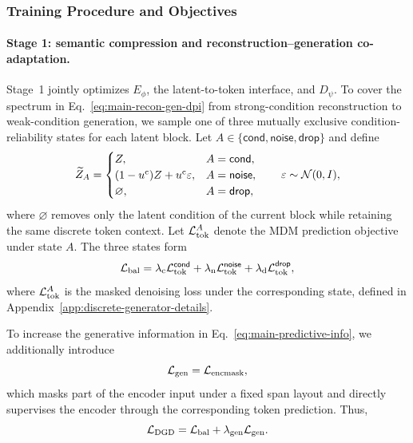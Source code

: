 \subsubsection{Training Procedure and Objectives}
\label{subsec:workflow-train}

\paragraph{Stage 1: semantic compression and reconstruction--generation co-adaptation.}
Stage~1 jointly optimizes $E_\phi$, the latent-to-token interface, and $D_\psi$. To cover the spectrum in Eq.~\eqref{eq:main-recon-gen-dpi} from strong-condition reconstruction to weak-condition generation, we sample one of three mutually exclusive condition-reliability states for each latent block. Let $A\in\{\textsf{cond},\textsf{noise},\textsf{drop}\}$ and define
\begin{equation}
    \widetilde Z_A=
    \begin{cases}
        Z, & A=\textsf{cond},\\
        (1-u^{\mathrm c})Z+u^{\mathrm c}\varepsilon,
        & A=\textsf{noise},\\
        \varnothing, & A=\textsf{drop},
    \end{cases}
    \qquad
    \varepsilon\sim\mathcal{N}(0,I),
    \label{eq:workflow-reliability}
\end{equation}
where $\varnothing$ removes only the latent condition of the current block while retaining the same discrete token context. Let $\mathcal{L}_{\mathrm{tok}}^{A}$ denote the MDM prediction objective under state $A$. The three states form
\begin{equation}
    \mathcal{L}_{\mathrm{bal}}
    =\lambda_{\mathrm c}\mathcal{L}_{\mathrm{tok}}^{\textsf{cond}}
    +\lambda_{\mathrm n}\mathcal{L}_{\mathrm{tok}}^{\textsf{noise}}
    +\lambda_{\mathrm d}\mathcal{L}_{\mathrm{tok}}^{\textsf{drop}},
    \label{eq:workflow-balance-loss}
\end{equation}
where $\mathcal{L}_{\mathrm{tok}}^{A}$ is the masked denoising loss under the corresponding state, defined in Appendix~\ref{app:discrete-generator-details}.

To increase the generative information in Eq.~\eqref{eq:main-predictive-info}, we additionally introduce
\begin{equation}
    \mathcal{L}_{\mathrm{gen}}=\mathcal{L}_{\mathrm{encmask}},
    \label{eq:workflow-gen-loss}
\end{equation}
which masks part of the encoder input under a fixed span layout and directly supervises the encoder through the corresponding token prediction. Thus,
\begin{equation}
    \mathcal{L}_{\mathrm{DGD}}
    =\mathcal{L}_{\mathrm{bal}}
    +\lambda_{\mathrm{gen}}\mathcal{L}_{\mathrm{gen}}.
    \label{eq:workflow-dg-loss}
\end{equation}

